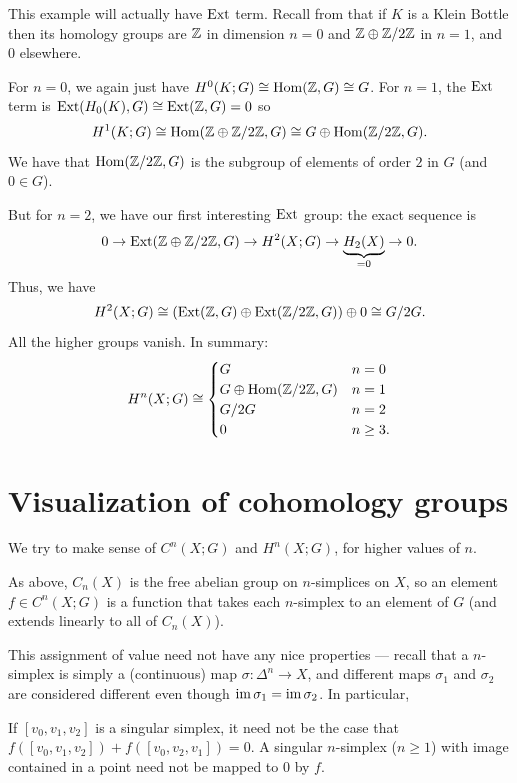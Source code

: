 \begin{example}
	This example will actually have $\operatorname{Ext}$ term.
	Recall from  that if $K$ is a Klein Bottle then its homology groups are
	$\mathbb Z$ in dimension $n=0$ and $\mathbb Z \oplus \mathbb Z/2\mathbb Z$ in $n=1$, and $0$ elsewhere.

	For $n=0$, we again just have $H^0(K;G) \cong \operatorname{Hom}(\mathbb Z, G) \cong G$.
	For $n=1$, the $\operatorname{Ext}$ term is $\operatorname{Ext}(H_0(K), G) \cong \operatorname{Ext}(\mathbb Z, G) = 0$
	so \[ H^1(K;G) \cong \operatorname{Hom}(\mathbb Z \oplus \mathbb Z/2\mathbb Z, G) \cong G \oplus \operatorname{Hom}(\mathbb Z/2\mathbb Z, G). \]
	We have that $\operatorname{Hom}(\mathbb Z/2\mathbb Z,G)$ is the subgroup
	of elements of order $2$ in $G$ (and $0 \in G$).

	But for $n=2$, we have our first interesting $\operatorname{Ext}$ group:
	the exact sequence is
	\[ 0 \to \operatorname{Ext}(\mathbb Z \oplus \mathbb Z/2\mathbb Z, G) \to H^2(X;G) \to \underbrace{H_2(X)}_{=0} \to 0. \]
	Thus, we have
	\[ H^2(X;G) \cong \left( \operatorname{Ext}(\mathbb Z,G) \oplus \operatorname{Ext}(\mathbb Z/2\mathbb Z,G) \right) \oplus 0
		\cong G/2G. \]
	All the higher groups vanish.
	In summary:
	\[
		H^n(X;G) \cong
		\begin{cases}
			G & n = 0 \\
			G \oplus \operatorname{Hom}(\mathbb Z/2\mathbb Z, G) & n = 1 \\
			G/2G & n = 2 \\
			0 & n \ge 3.
		\end{cases}
	\]
\end{example}

\section{Visualization of cohomology groups}
\label{sec:visual_cohom_groups}

We try to make sense of $C^n(X; G)$ and $H^n(X; G)$, for higher values of $n$.

As above, $C_n(X)$ is the free abelian group on $n$-simplices on $X$, so an element
$f \in C^n(X; G)$ is a function that takes each $n$-simplex to an element of $G$
(and extends linearly to all of $C_n(X)$).

This assignment of value need not have any nice properties --- recall that a $n$-simplex is simply
a (continuous) map $\sigma \colon \Delta^n \to X$, and different maps $\sigma_1$ and
$\sigma_2$ are considered different even though $\operatorname{im} \sigma_1 = \operatorname{im} \sigma_2$.
In particular,
\begin{itemize}
	\ii If $[v_0, v_1, v_2]$ is a singular simplex,
	it need not be the case that $f([v_0, v_1, v_2]) + f([v_0, v_2, v_1]) = 0$.
	\ii A singular $n$-simplex ($n \geq 1$)
	with image contained in a point need not be mapped to $0$ by $f$.
\end{itemize}


